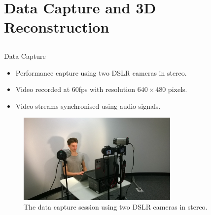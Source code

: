 \documentclass{beamer}
\begin{document}
\section{Data Capture and 3D Reconstruction}
\subsection{ }
\begin{frame}{Data Capture}

\begin{itemize}
\setlength\itemsep{0.5em}
\item Performance capture using two DSLR cameras in stereo.
\item Video recorded at 60fps with resolution $640 \times 480$ pixels.
\item Video streams synchronised using audio signals.
\end{itemize}

\begin{center}
\begin{figure}
\includegraphics[width=0.7\textwidth]{img/setup1}
\caption{\tiny{The data capture session using two DSLR cameras in stereo.}}
\end{figure}
\end{center}

\end{frame}
\end{document}
